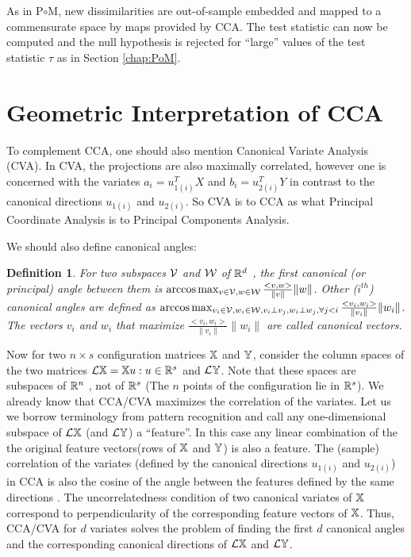 \documentclass[12pt,oneside,final]{thesis}
\newtheorem{defn}{Definition}
\begin{document}
As in P$ \circ $M, new dissimilarities are out-of-sample embedded and mapped to a commensurate  space by maps provided by CCA. The test statistic   can now be computed and  the null hypothesis is rejected for ``large'' values of the test statistic $\tau$  as in Section \ref{chap:PoM}.



\section{Geometric Interpretation of CCA}

To complement CCA, one should also mention Canonical Variate Analysis (CVA). In CVA, the  projections are also maximally correlated, however one is concerned with the variates $a_i={u}_{1(i)}^TX $ and $b_i={u}_{2(i)}^T Y $ in contrast to the canonical directions ${u}_{1(i)}$ and ${u}_{2(i)}$. So CVA is to CCA  as what Principal Coordinate Analysis is to Principal Components Analysis.

We should also define canonical angles:

\begin{defn}
For two subspaces $\mathcal{V}$ and $\mathcal{W}$ of $\mathbb{R}^d$ , the first \emph{canonical} (or \emph{principal})  angle  between them  is $\arccos \max_{v \in \mathcal{V}, w \in \mathcal{W}}\frac{<v,w>}{\|v\|}{\|w\|}$. Other ($i^{th}$) canonical angles are defined as 
$\arccos \max_{v_i \in \mathcal{V}, w_i \in \mathcal{W}, v_i \perp v_j, w_i \perp w_j, \forall j<i}\frac{<v_i,w_i>}{\|v_i\|}{\|w_i\|}$.
The vectors $v_i$ and $w_i$ that maximize $\frac{<v_i,w_i>}{\|v_i\|}{\|w_i\|}$ are called \emph{canonical} vectors.
\end{defn}

Now for two $n \times s$ configuration matrices $\mathbb{X}$ and $\mathbb{Y}$, consider the column spaces of the two  matrices  $\mathcal{L}{\mathbb{X}}={\mathbb{X} u : u \in \mathbb{R}^s}$ and ${\mathcal{L}{\mathbb{Y}}}$. Note that these spaces are subspaces of $\mathbb{R}^n$ , not of $\mathbb{R}^s$ (The $n$ points of the configuration lie in $\mathbb{R}^s$). 
We already know that CCA/CVA maximizes the correlation of the variates. Let us we borrow terminology from pattern recognition and call any one-dimensional subspace of   $\mathcal{L}{\mathbb{X}}$ (and $\mathcal{L}{\mathbb{Y}}$) a ``feature''. In this case any linear combination of the  the  original feature vectors(rows of $\mathbb{X}$ and $\mathbb{Y}$) is also a feature. The (sample) correlation of the variates (defined by the canonical directions $u_{1(i)}$ and $u_{2(i)}$) in CCA is also  the cosine of the angle between the features defined by the same directions . The uncorrelatedness condition of two canonical variates of $\mathbb{X}$  correspond to perpendicularity of the corresponding feature vectors of $\mathbb{X}$. Thus,
 CCA/CVA for $d$ variates solves the problem of finding the first $d$ canonical angles and the corresponding canonical directions of $\mathcal{L}{\mathbb{X}}$ and $\mathcal{L}{\mathbb{Y}}$.
 
\end{document}
